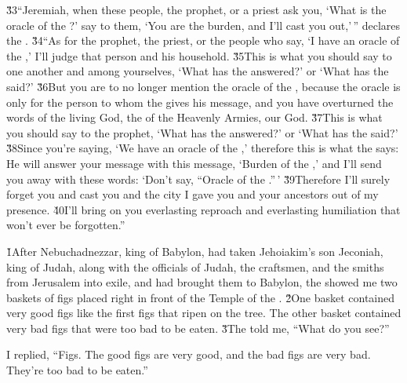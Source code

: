 \v{33}``Jeremiah, when these people, the prophet, or a priest ask you, `What is the oracle of the ?' say to them, `You are the burden, and I'll cast you out,'\,'' declares the . \v{34}``As for the prophet, the priest, or the people who say, `I have an oracle of the ,' I'll judge that person and his household. \v{35}This is what you should say to one another and among yourselves, `What has the  answered?' or `What has the  said?' \v{36}But you are to no longer mention the oracle of the , because the oracle is only for the person to whom the  gives his message, and you have overturned the words of the living God, the  of the Heavenly Armies, our God. \v{37}This is what you should say to the prophet, `What has the  answered?' or `What has the  said?' \v{38}Since you're saying, `We have an oracle of the ,' therefore this is what the  says: He will answer your message with this message, `Burden of the ,' and I'll send you away with these words: `Don't say, ``Oracle of the .''\,' \v{39}Therefore I'll surely forget you and cast you and the city I gave you and your ancestors out of my presence. \v{40}I'll bring on you everlasting reproach and everlasting humiliation that won't ever be forgotten.''

\v{1}After Nebuchadnezzar, king of Babylon, had taken Jehoiakim's son Jeconiah, king of Judah, along with the officials of Judah, the craftsmen, and the smiths from Jerusalem into exile, and had brought them to Babylon, the  showed me two baskets of figs placed right in front of the Temple of the . \v{2}One basket contained very good figs like the first figs that ripen on the tree. The other basket contained very bad figs that were too bad to be eaten. \v{3}The  told me, ``What do you see?''

I replied, ``Figs. The good figs are very good, and the bad figs are very bad. They're too bad to be eaten.''

